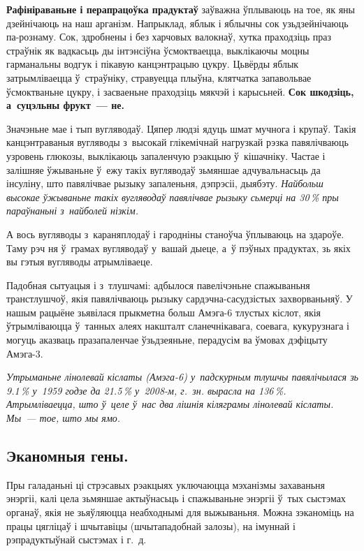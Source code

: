 \textbf{Рафініраваньне і перапрацоўка прадуктаў} заўважна ўплываюць на тое, як яны дзейнічаюць на наш арганізм. Напрыклад, яблык і яблычны сок узьдзейнічаюць па-рознаму. Сок, здробнены і без харчовых валокнаў, хутка праходзіць праз страўнік як вадкасьць ды інтэнсіўна ўсмоктваецца, выклікаючы моцны гарманальны водгук і пікавую канцэнтрацыю цукру. Цьвёрды яблык затрымліваецца ў~страўніку, стравуецца плыўна, клятчатка запавольвае ўсмоктваньне цукру, і засваеньне праходзіць мякчэй і карысьней. \textbf{Сок шкодзіць, а~суцэльны фрукт~--- не.}

Значэньне мае і тып вугляводаў. Цяпер людзі ядуць шмат мучнога і крупаў. Такія канцэнтраваныя вугляводы з~высокай глікемічнай нагрузкай рэзка павялічваюць узровень глюкозы, выклікаюць запаленчую рэакцыю ў~кішачніку. Частае і залішняе ўжываньне ў~ежу такіх вугляводаў зьмяншае адчувальнасьць да інсуліну, што павялічвае рызыку запаленьня, дэпрэсіі, дыябэту. \emph{Найбольш высокае ўжываньне такіх вугляводаў павялічвае рызыку сьмерці на 30\,\% пры параўнаньні з~найболей нізкім.}

А вось вугляводы з~караняплодаў і гародніны станоўча ўплываюць на здароўе. Таму рэч ня ў~грамах вугляводаў у~вашай дыеце, а~ў пэўных прадуктах, зь якіх вы гэтыя вугляводы атрымліваеце.

Падобная сытуацыя і з~тлушчамі: адбылося павелічэньне спажываньня транстлушчоў, якія павялічваюць рызыку сардэчна-сасудзістых захворваньняў. У нашым рацыёне зьявілася прыкметна больш Амэга-6 тлустых кіслот, якія ўтрымліваюцца ў~танных алеях накшталт сланечнікавага, соевага, кукурузнага і могуць аказваць празапаленчае ўзьдзеяньне, перадусім ва ўмовах дэфіцыту Амэга-3. 

\emph{Утрыманьне лінолевай кіслаты (Амэга-6) у~падскурным тлушчы павялічылася зь 9.1\,\% у~1959 годзе да 21.5\,\% у~2008-м, г.~зн. вырасла на 136\,\%. Атрымліваецца, што ў~целе ў~нас два лішнія кіляграмы лінолевай кіслаты. Мы~--- тое, што мы ямо.}

\subsection*{Эканомныя гены.}

Пры галаданьні ці стрэсавых рэакцыях уключаюцца мэханізмы захаваньня энэргіі, калі цела зьмяншае актыўнасьць і спажываньне энэргіі ў~тых сыстэмах органаў, якія не зьяўляюцца неабходнымі для выжываньня. Можна зэканоміць на працы цягліцаў і шчытавіцы (шчытападобнай залозы), на імуннай і рэпрадуктыўнай сыстэмах і г.~д.

